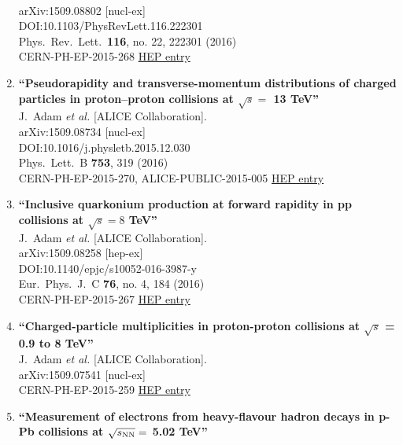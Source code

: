 \begin{enumerate}
  \\{}arXiv:1509.08802 [nucl-ex]
  \\{}DOI:10.1103/PhysRevLett.116.222301
  \\{}Phys.\ Rev.\ Lett.\  {\bf 116}, no. 22, 222301 (2016)
  \\{}CERN-PH-EP-2015-268
\href{http://inspirehep.net/record/1395296}{HEP entry}
\item%
{\bf ``Pseudorapidity and transverse-momentum distributions of charged particles in proton–proton collisions at $\sqrt s=$ 13 TeV''}
  \\{}J.~Adam {\it et al.} [ALICE Collaboration].
  \\{}arXiv:1509.08734 [nucl-ex]
  \\{}DOI:10.1016/j.physletb.2015.12.030
  \\{}Phys.\ Lett.\ B {\bf 753}, 319 (2016)
  \\{}CERN-PH-EP-2015-270, ALICE-PUBLIC-2015-005
\href{http://inspirehep.net/record/1395253}{HEP entry}
\item%
{\bf ``Inclusive quarkonium production at forward rapidity in pp collisions at $\sqrt{s}=8$ TeV''}
  \\{}J.~Adam {\it et al.} [ALICE Collaboration].
  \\{}arXiv:1509.08258 [hep-ex]
  \\{}DOI:10.1140/epjc/s10052-016-3987-y
  \\{}Eur.\ Phys.\ J.\ C {\bf 76}, no. 4, 184 (2016)
  \\{}CERN-PH-EP-2015-267
\href{http://inspirehep.net/record/1395099}{HEP entry}
\item%
{\bf ``Charged-particle multiplicities in proton-proton collisions at $\sqrt{s}$ = 0.9 to 8 TeV''}
  \\{}J.~Adam {\it et al.} [ALICE Collaboration].
  \\{}arXiv:1509.07541 [nucl-ex]
  \\{}CERN-PH-EP-2015-259
\href{http://inspirehep.net/record/1394854}{HEP entry}
\item%
{\bf ``Measurement of electrons from heavy-flavour hadron decays in p-Pb collisions at $\sqrt{s_{\rm NN}} =$ 5.02 TeV''}

\end{enumerate}
